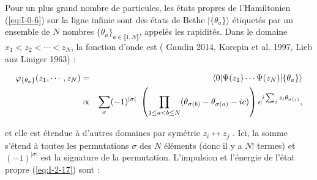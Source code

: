Pour un plus grand nombre de particules, les états propres de l'Hamiltonien (\ref{eq:I-0-6}) sur la ligne infinie sont des états de Bethe $\vert \{\theta_a\}\rangle $ étiquetés par un ensemble de $N$ nombres $\{\theta_a\}_{a \in \llbracket 1 , N \rrbracket } $, appelés les rapidités. Dans le domaine $x_1 < z_2 < \cdots < z_N$, la fonction d'onde est ({\color{blue} Gaudin 2014}, {\color{blue}Korepin et al. 1997}, {\color{blue}Lieb anz Liniger 1963}) :

\begin{eqnarray}
	\varphi_{\{\theta_a\}} ( z_1 , \cdots , z_N ) & = & \langle 0 \vert \Psi ( z_1 ) \cdots \Psi (z_N ) \vert \{ \theta_a \} \rangle \notag\\
	& \propto & \sum_\sigma ( - 1 ) ^{ \vert \sigma \vert } \left ( \prod_{ 1 \leq a < b \leq N } ( \theta_{\sigma(b)} - \theta_{\sigma(a)} - ic ) \right ) e^{i \sum_j z_i \theta_{ \sigma(j)}}\label{eq:I-2-17},
\end{eqnarray}

et elle est étendue à d'autres domaines par symétrie $z_i \leftrightarrow z_j$ . Ici, la somme s'étend à toutes les permutations $\sigma$ des $N$ éléments (donc il y a $N!$ termes) et $(-1)^{|\sigma|}$ est la signature de la permutation. L'impulsion et l'énergie de l'état propre (\ref{eq:I-2-17}) sont :